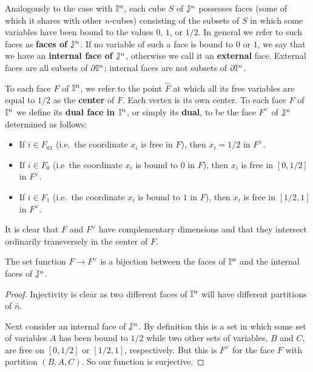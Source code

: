 Analogously to the case with $\mathbb{I}^n$, each cube $S$ of $\mathbb{J}^n$ possesses faces (some of which it shares with other $n$-cubes) consisting of the subsets of $S$ in which some variables have been bound to the values $0$, $1$, or $1/2$. In general we refer to such faces as \textbf{faces of $\mathbb{J}^n$}. If no variable of such a face is bound to $0$ or $1$, we say that we have an \textbf{internal face of $\mathbb{J}^n$}, otherwise we call it an \textbf{external} face. External faces are all subsets of $\partial \mathbb{I}^n$; internal faces are not subsets of $\partial \mathbb{I}^n$.

To each face $F$ of $\mathbb{I}^n$, we refer to the point $\hat F$ at which all its free variables are equal to $1/2$ as the \textbf{center} of $F$. Each vertex is its own center. To each face $F$ of $\mathbb{I}^n$ we define its \textbf{dual face in $\mathbb{I}^n$}, or simply its \textbf{dual}, to be the face $F^\vee$ of $\mathbb{J}^n$ determined as follows:
\begin{itemize}
\item If $i\in F_{01}$ (i.e.\ the coordinate $x_i$ is free in $F$), then $x_i=1/2$ in $F^\vee$. 

\item If $i\in F_0$ (i.e\ the coordinate $x_i$ is bound to $0$ in $F$), then $x_i$ is free in $[0,1/2]$ in $F^\vee$.

\item If $i\in F_1$ (i.e.\ the coordinate $x_i$ is bound to $1$ in $F$), then $x_i$ is free in $[1/2,1]$ in $F^\vee$.
\end{itemize}

It is clear that $F$ and $F^\vee$ have complementary dimensions and that they intersect ordinarily transversely in the center of $F$. 

\begin{lemma}
The set function $F\to F^\vee$ is a bijection between the faces of $\mathbb{I}^n$ and the internal faces of $\mathbb{J}^n$.
\end{lemma}
\begin{proof}
Injectivity is clear as two different faces of $\mathbb{I}^n$ will have different partitions of $\bar n$. 

Next consider an internal face of $\mathbb{J}^n$. By definition this is a set in which some set of variables $A$ has  been bound to $1/2$ while two other sets of variables, $B$ and $C$, are free on $[0,1/2]$ or $[1/2,1]$, respectively. But this is $F^\vee$ for the face $F$ with partition $(B,A,C)$. So our function is surjective.
\end{proof}

